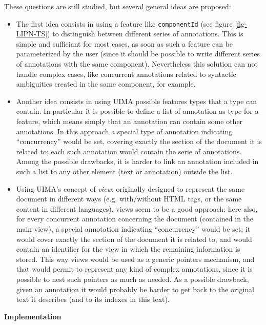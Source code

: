 These questions are still studied, but several general ideas are proposed:
\begin{itemize}
\item The first idea consists in using a feature like {\tt componentId} (see figure \ref{fig-LIPN-TS}) to distinguish between different series of annotations. This is simple and sufficiant for most cases, as soon as such a feature can be parameterized by the user (since it should be possible to write different series of annotations with the same component). Nevertheless this solution can not handle complex cases, like concurrent annotations related to syntactic ambiguities created in the same component, for example.
\item Another idea consists in using UIMA possible features types that a type can contain. In particular it is possible to define a list of annotation as type for a feature, which means simply that an annotation can contain some other annotations. In this approach a special type of annotation indicating ``concurrency'' would be set, covering exactly the section of the document it is related to; each such annotation would contain the serie of annotations. Among the possible drawbacks, it is harder to link an annotation included in such a list to any other element (text or annotation) outside the list.
\item Using UIMA's concept of {\em view}: originally designed to represent the same document in different ways (e.g. with/without HTML tags, or the same content in different languages), views seem to be a good approach: here also, for every concurrent annotation concerning the document (contained in the main view), a special annotation indicating ``concurrency'' would be set; it would cover exactly the section of the document it is related to, and would contain an identifier for the view in which the remaining information is stored. This way views would be used as a generic pointers mechanism, and that would permit to represent any kind of complex annotations, since it is possible to nest such pointers as much as needed. As a possible drawback, given an annotation it would probably be harder to get back to the original text it describes (and to its indexes in this text).
\end{itemize}



{\bf Implementation}
\medskip



